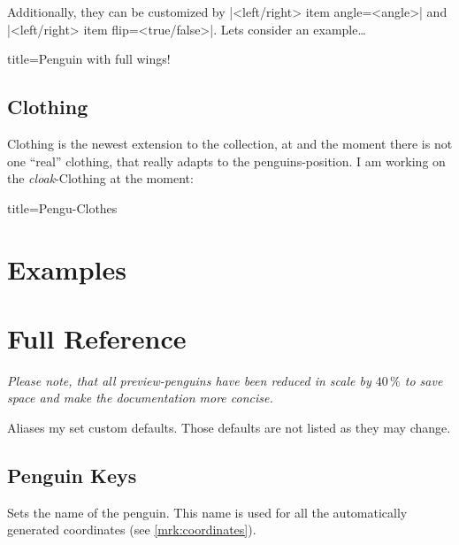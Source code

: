\documentclass[parskip=half,english,numbers=noenddot,footnotes=nomultiple,oneside]{scrartcl}
\let\say\enquote
\def\lstfnsize{-.7}
\begin{document}
Additionally, they can be customized by |<left/right> item angle=<angle>| and |<left/right> item flip=<true/false>|.
Lets consider an example\ldots
\begin{tcblisting}{title={Penguin with full wings!}}
\begin{tikzpicture}[scale=.75]
	\pingu[lightsaber right=orange,
	  lollipop left,
	  right item angle=70,
	  right wing raise, left wing grab]
	\pingu[cane left, right item flip,
	  sign post right={Hi!}, xshift=35mm]
\end{tikzpicture}
\end{tcblisting}

\subsection{Clothing}
Clothing is the newest extension to the collection, at and the moment there is not one \say{real} clothing, that really adapts to the penguins-position.
I am working on the \textit{cloak}-Clothing at the moment:
\begin{tcblisting}{title={Pengu-Clothes}}
\begin{tikzpicture}[scale=.75]
	\pingu[cloak]
\end{tikzpicture}
\end{tcblisting}

\section{Examples}

\appendix
\section{Full Reference}\label{sec:full-ref}

\begin{center}
	\textit{Please note, that all preview-penguins have been reduced in scale by \(40\,\%\) to save space and make the documentation more concise.}
\end{center}

Aliases my set custom defaults. Those defaults are not listed as they may change.

\def\lstfnsize{-1.65}

\subsection{Penguin Keys}
	Sets the name of the penguin. This name is used for all the automatically generated coordinates (see \autoref{mrk:coordinates}).
\endkeyexplain
\end{document}
